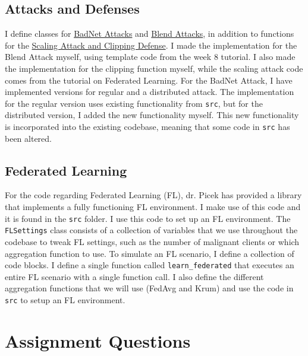 \documentclass{article}
\begin{document}
\subsection{Attacks and Defenses}
I define classes for \href{https://arxiv.org/abs/1708.06733}{BadNet Attacks} and \href{https://arxiv.org/pdf/1712.05526}{Blend Attacks}, in addition to functions for the \href{http://proceedings.mlr.press/v108/bagdasaryan20a/bagdasaryan20a.pdf}{Scaling Attack and Clipping Defense}.
I made the implementation for the Blend Attack myself, using template code from the week 8 tutorial.
I also made the implementation for the clipping function myself, while the scaling attack code comes from the tutorial on Federated Learning.
For the BadNet Attack, I have implemented versions for regular and a distributed attack.
The implementation for the regular version uses existing functionality from \texttt{src}, but for the distributed version, I added the new functionality myself.
This new functionality is incorporated into the existing codebase, meaning that some code in \texttt{src} has been altered.

\subsection{Federated Learning}
For the code regarding Federated Learning (FL), dr. Picek has provided a library that implements a fully functioning FL environment.
I make use of this code and it is found in the \texttt{src} folder.
I use this code to set up an FL environment.
The \texttt{FLSettings} class consists of a collection of variables that we use throughout the codebase to tweak FL settings, such as the number of malignant clients or which aggregation function to use.
To simulate an FL scenario, I define a collection of code blocks.
I define a single function called \texttt{learn\_federated} that executes an entire FL scenario with a single function call.
I also define the different aggregation functions that we will use (FedAvg and Krum) and use the code in \texttt{src} to setup an FL environment.

\section{Assignment Questions}
        
\end{document}
